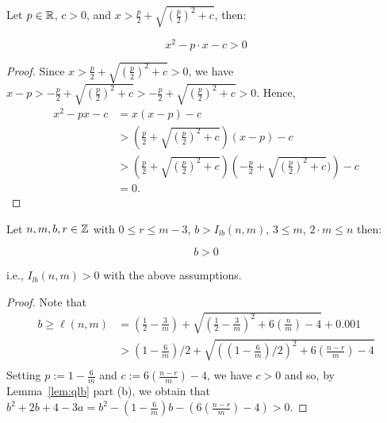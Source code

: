 \begin{lemma}[qlb]
    \label{lem:qlb}
    \leanok
    Let $p\in \mathbb{R}$, $c > 0$, and $x > \frac{p}{2} + \sqrt{\left(\frac{p}{2}\right)^2 + c}$, then:

    \[
        x^2 - p \cdot x- c > 0
    \]
\end{lemma}

\begin{proof}
    \leanok
    Since $x >\frac{p}{2} + \sqrt{\left(\frac{p}{2}\right)^ 2 + c} > 0$,
    we have $x - p > -\frac{p}{2} + \sqrt{\left(\frac{p}{2}\right)^ 2 + c}
    >-\frac{p}{2} + \sqrt{\left(\frac{p}{2}\right)^ 2 + c} > 0$. 
    Hence,
  \begin{align*}
    x^2 - px - c
    & = x(x - p) - c \\
    & > \left(\frac{p}{2} + \sqrt{\left(\frac{p}{2}\right)^ 2 + c}\right)
         (x-p) - c \\
    & > \left(\frac{p}{2} + \sqrt{\left(\frac{p}{2}\right)^ 2 + c}\right)
    \left(-\frac{p}{2}+\sqrt{\left(\frac{p}{2}\right)^ 2 + c})\right) - c \\
    & = 0.
  \end{align*}
\end{proof}

\begin{lemma}[I lb pos]
    \label{lem:I_lb_pos}
    \leanok
    Let $n,m,b,r\in\mathbb{Z}$ with $0 \leq r \leq m - 3$, $b > I_{lb}(n,m)$, $3 \leq m$, $2 \cdot m \leq n$ then:

    \[
        b > 0
    \]

    i.e., $I_{lb}(n,m) > 0$ with the above assumptions.
    
\end{lemma}

\begin{proof}
    \leanok
    Note that
    \begin{align*}
    b \geq \ell(n,m)
    & =
      \left(\frac{1}{2}-\frac{3}{m}\right)
      + \sqrt{\left(\frac{1}{2}-\frac{3}{m}\right)^2
      + 6\left(\frac{n}{m}\right) - 4}+0.001 \\ 
    & >
      \left(1-\frac{6}{m}\right)/2
      +\sqrt{\left(\left(1-\frac{6}{m}\right)/2\right)^2
      + 6\left(\frac{n-r}{m}\right) - 4} \\
    \end{align*}
    Setting $p := 1 - \frac{6}{m}$ and $c := 6 \left(\frac{n - r}{m}\right) - 4$,
      we have $c > 0$ and so, by Lemma~\ref{lem:qlb} part (b), we obtain that
    $b^2 + 2b + 4 - 3a = b ^ 2 - \left(1 - \frac{6}{m}\right) b -
    \left(6\left(\frac{n - r}{m}\right) - 4\right) > 0$.
\end{proof}

